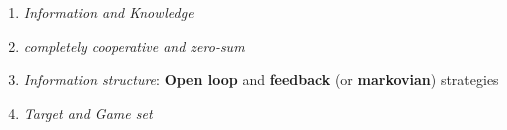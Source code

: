 \begin{enumerate}
    \item \textit{Information and Knowledge}
    \item \textit{completely cooperative and zero-sum}
    \item \textit{Information structure}: \textbf{Open loop} and \textbf{feedback} (or \textbf{markovian}) strategies
    \item \textit{Target and Game set}
\end{enumerate}